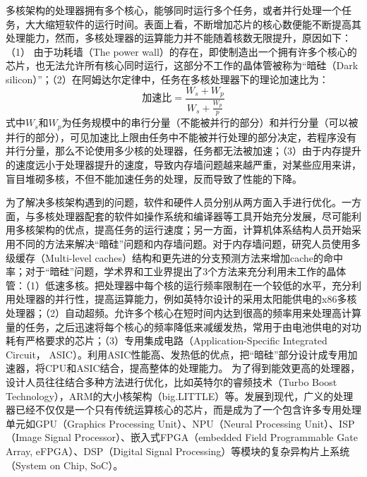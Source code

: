 多核架构的处理器拥有多个核心，能够同时运行多个任务，或者并行处理一个任务，大大缩短软件的运行时间。表面上看，不断增加芯片的核心数便能不断提高其处理能力，然而，多核处理器的运算能力并不能随着核数无限提升，原因如下：（1） 由于功耗墙（The power wall）的存在，即使制造出一个拥有许多个核心的芯片，也无法允许所有核心同时运行\cite{dark_silicon}，这部分不工作的晶体管被称为“暗硅（Dark silicon）”；（2）在阿姆达尔定律中\cite{amdahl_law}，任务在多核处理器下的理论加速比为：
\begin{equation}
    \label{amdahl_law}
    \text{加速比} = \frac{W_s+W_p}{W_s+ \frac{W_p}{p}}
\end{equation}
式中$W_s$和$W_p$为任务规模中的串行分量（不能被并行的部分）和并行分量（可以被并行的部分），可见加速比上限由任务中不能被并行处理的部分决定，若程序没有并行分量，那么不论使用多少核的处理器，任务都无法被加速；（3）由于内存提升的速度远小于处理器提升的速度，导致内存墙问题越来越严重，对某些应用来讲，盲目堆砌多核，不但不能加速任务的处理，反而导致了性能的下降\cite{multicore_bad}。

为了解决多核架构遇到的问题，软件和硬件人员分别从两方面入手进行优化。一方面，与多核处理器配套的软件如操作系统和编译器等工具开始充分发展，尽可能利用多核架构的优点，提高任务的运行速度；另一方面，计算机体系结构人员开始采用不同的方法来解决“暗硅”问题和内存墙问题。对于内存墙问题，研究人员使用多级缓存（Multi-level caches）结构和更先进的分支预测方法来增加cache的命中率；对于“暗硅”问题，学术界和工业界提出了3个方法来充分利用未工作的晶体管\cite{is_dark_silicon}：（1）低速多核。把处理器中每个核的运行频率限制在一个较低的水平，充分利用处理器的并行性，提高运算能力，例如英特尔设计的采用太阳能供电的x86多核处理器\cite{solar_x86}；（2）自动超频。允许多个核心在短时间内达到很高的频率用来处理高计算量的任务，之后迅速将每个核心的频率降低来减缓发热，常用于由电池供电的对功耗有严格要求的芯片；（3）专用集成电路（Application-Specific Integrated Circuit， ASIC）。利用ASIC性能高、发热低的优点，把“暗硅”部分设计成专用加速器，将CPU和ASIC结合，提高整体的处理能力。
为了得到能效更高的处理器，设计人员往往结合多种方法进行优化，比如英特尔的睿频技术（Turbo Boost Technology）\cite{intel_turbo_boost}，ARM的大小核架构（big.LITTLE）\cite{arm_big_little}等。发展到现代，广义的处理器已经不仅仅是一个只有传统运算核心的芯片，而是成为了一个包含许多专用处理单元如GPU（Graphics Processing Unit）、NPU（Neural Processing Unit）、ISP（Image Signal Processor）、嵌入式FPGA（embedded Field Programmable Gate Array, eFPGA）、DSP（Digital Signal Processing）等模块的复杂异构片上系统（System on Chip, SoC）。

